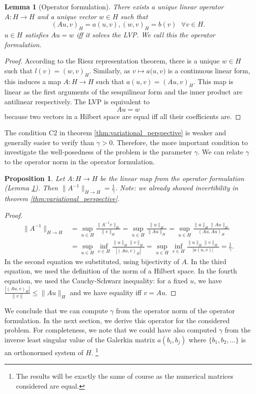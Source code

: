 \documentclass[12pt,journal,compsoc, onecolumn]{IEEEtran}
\newtheorem{lemma}[theorem]{Lemma}
\newtheorem{proposition}[theorem]{Proposition}
\begin{document}
\begin{lemma}[Operator formulation]
\label{lem:operator_formulation}
    There exists a unique linear operator $A: H \rightarrow H$ and a unique vector $w \in H$ such that $$(Au, v)_H = {a(u,v)}, (w, v)_H  = {b(v)} \text{ } \forall v \in H.$$ $u \in H$ satisfies $Au = w$ iff it solves the LVP. We call this the operator formulation.
\end{lemma}

\begin{proof}
    According to the Riesz representation theorem, there is a unique $w \in H$ such that ${l(v)} = (w,v)_H$. Similarly, as \(v \mapsto {a(u, v})\) is a continuous linear form, this induces a map $A: H \rightarrow H$ such that \({a(u, v)}=( A u, v)_H\). This map is linear as the first arguments of the sesquilinear form and the inner product are antilinear respectively. The LVP is equivalent to 
    $$
        Au = w
    $$
    because two vectors in a Hilbert space are equal iff all their coefficients are. 
    \end{proof}
    
\noindent The condition C2 in theorem \ref{thm:variational_perspective} is weaker and generally easier to verify than $\gamma >0$. Therefore, the more important condition to investigate the well-posedness of the problem is the parameter $\gamma$.
We can relate $\gamma$ to the operator norm in the operator formulation. 
\begin{proposition}
\label{prop:inf-sup-operator}
Let ${A}: H \rightarrow H$ be the linear map from the operator formulation (Lemma \ref{lem:operator_formulation}).
Then $\|A^{-1}\|_{H\rightarrow H} =\frac{1}{\gamma}$. Note: we already showed invertibility in theorem \ref{thm:variational_perspective}.
\end{proposition}
\begin{proof}
 \begin{align*}
    \|A^{-1}\|_{H \rightarrow H} & = 
    \sup\limits_{u \in H} \frac{\|A^{-1}v\|_{H}}{\|v\|_{H}} = 
    \sup\limits_{u \in H} \frac{\|u\|_{H}}{\|Au\|_{H}} = 
    \sup\limits_{u \in H} \frac{\|u\|_{H} \|Au\|_{H}}{(Au, Au)_{H}} \\
    &= \sup\limits_{u \in H} \inf\limits_{v \in H} \frac{\|u\|_{H} \|v\|_{H}}{|(Au, v)_{H}|} 
    =  \sup\limits_{u \in H} \inf\limits_{v \in H} \frac{\|u\|_{H} \|v\|_{H}}{|a(u,v)|} 
    = \frac{1}{\gamma}.
    \end{align*}
    In the second equation we substituted, using bijectivity of $A$. In the third equation, we used the definition of the norm of a Hilbert space. In the  fourth equation, we used the Cauchy-Schwarz inequality: for a fixed $u$, we have $\frac{|(Au, v)_H|}{\|v\|} \leq \|Au\|_H$ and we have equality iff $v = Au$.
\end{proof}
\noindent We conclude that we can compute $\gamma$ from the operator norm of the operator formulation. In the next section, we derive this operator for the considered problem. For completeness, we note that we could have also computed $\gamma$ from the inverse least singular value of the Galerkin matrix $a(b_i,b_j)$ where $\{b_1, b_2, ...\}$ is an orthonormed system of $H$. \footnote{The results will be exactly the same of course as the numerical matrices considered are equal.}
\end{document}
